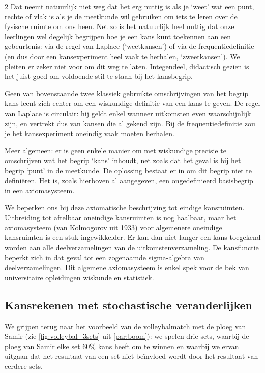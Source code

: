 \begin{multicols}{2}
Dat neemt natuurlijk niet weg dat het erg nuttig is als je ‘weet’ wat een punt, rechte of vlak is als je de meetkunde wil gebruiken om iets te leren over de fysische ruimte om ons heen. Net zo is het natuurlijk heel nuttig dat onze leerlingen wel degelijk begrijpen hoe je een kans kunt toekennen aan een gebeurtenis: via de regel van Laplace (‘weetkansen’) of via de frequentiedefinitie (en dus door een kansexperiment heel vaak te herhalen, ‘zweetkansen’). We pleiten er zeker niet voor om dit weg te laten. Integendeel, didactisch gezien is het juist goed om voldoende stil te staan bij het kansbegrip.

Geen van bovenstaande twee klassiek gebruikte omschrijvingen van het begrip kans leent zich echter om een wiskundige definitie van een kans te geven. De regel van Laplace is circulair: hij geldt enkel wanneer uitkomsten even waarschijnlijk zijn, en vertrekt dus van kansen die al gekend zijn. Bij de frequentiedefinitie zou je het kansexperiment oneindig vaak moeten herhalen. 

Meer algemeen: er is geen enkele manier om met wiskundige precisie te omschrijven wat het begrip ‘kans’ inhoudt, net zoals dat het geval is bij het begrip ‘punt’ in de meetkunde. De oplossing bestaat er in om dit begrip niet te definiëren. Het is, zoals hierboven al aangegeven, een ongedefinieerd basisbegrip in een axiomasysteem.

We beperken ons bij deze axiomatische beschrijving tot eindige kansruimten. Uitbreiding tot aftelbaar oneindige kansruimten is nog haalbaar, maar het axiomasysteem (van Kolmogorov uit 1933) voor algemenere oneindige kansruimten is een stuk ingewikkelder. Er kan dan niet langer een kans toegekend worden aan alle deelverzamelingen van de uitkomstenverzameling. De kansfunctie beperkt zich in dat geval tot een zogenaamde sigma-algebra van deelverzamelingen. Dit algemene axiomasysteem is enkel spek voor de bek van universitaire opleidingen wiskunde en statistiek.

\subsection{Kansrekenen met stochastische veranderlijken}
\label{par:stochvar}
We grijpen terug naar het voorbeeld van de volleybalmatch met de ploeg van Samir (zie \autoref{fig:volleybal_3sets} uit \autoref{par:boom}): we spelen drie sets, waarbij de ploeg van Samir elke set 60\% kans heeft om te winnen en waarbij we ervan uitgaan dat het resultaat van een set niet beïnvloed wordt door het resultaat van eerdere sets.




\end{multicols}
